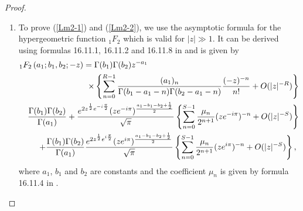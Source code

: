 \documentclass[smallextended]{svjour3}
\begin{document}
\begin{proof}
\begin{enumerate}
\item To prove (\ref{Lm2-1}) and (\ref{Lm2-2}), we use the asymptotic formula for the hypergeometric function ${}_1F_2$ which is valid for $|z|\gg 1$. It can be derived using formulas 16.11.1, 16.11.2 and 16.11.8 in \cite{ND} and is given by
\begin{eqnarray}
{}_1F_2\left(a_1;b_1,b_2;-z\right)=\Gamma(b_1)\Gamma(b_2)z^{-a_1}\hspace{6.5cm}\nonumber\\\times\left\{\sum\limits_{n=0}^{R-1}\frac{(a_1)_n }{\Gamma(b_1-a_1-n)\Gamma(b_2-a_1-n)}\frac{(-z)^{-n}}{n!}+O(|z|^{-R})\right\}\nonumber\\\frac{\Gamma(b_1)\Gamma(b_2)}{\Gamma(a_1)}
+\frac{e^{2z^{\frac{1}{2}}e^{-i\frac{\pi}{2}}}(ze^{-i\pi})^{\frac{a_1-b_1-b_2+\frac{1}{2}}{2}}}{\sqrt{\pi}}\left\{\sum\limits_{n=0}^{S-1}\frac{\mu_n}{2^{n+1}}(ze^{-i\pi})^{-n}+O(|z|^{-S})\right\}
\nonumber\\+\frac{\Gamma(b_1)\Gamma(b_2)}{\Gamma(a_1)}\frac{e^{2z^{\frac{1}{2}}e^{i\frac{\pi}{2}}}(ze^{i\pi})^{\frac{a_1-b_1-b_2+\frac{1}{2}}{2}}}{\sqrt{\pi}}\left\{\sum\limits_{n=0}^{S-1}\frac{\mu_n}{2^{n+1}}(ze^{i\pi})^{-n}+O(|z|^{-S})\right\},\hspace{.12cm}
\label{asy1-2}
\end{eqnarray}
where $a_1$, $b_1$ and $b_2$ are constants and the coefficient $\mu_n$ is given by formula 16.11.4 in \cite{ND}.


\end{enumerate}
\end{proof}
\end{document}
